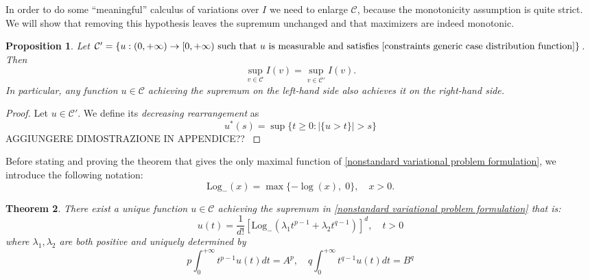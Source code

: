 \documentclass[corpo=11pt, stile=classica, tipotesi=custom,
greek, evenboxes, english]{toptesi}
\numberwithin{equation}{chapter}
\newtheorem{teo}{Theorem}[chapter] %
\newtheorem{prop}[teo]{Proposition}
\theoremstyle{remark}
\newcommand{\Log}{\ensuremath{\mathrm{Log}_-}}
\begin{document}
{\color{blue} In order to do some ``meaningful'' calculus of variations over $I$ we need to enlarge $\mathcal{C}$, because the monotonicity assumption is quite strict. We will show that removing this hypothesis leaves the supremum unchanged and that maximizers are indeed monotonic.}
\begin{prop}\label{monotonicity of maximizer}
	{\color{blue}Let $\mathcal{C}' = \{u : (0,+\infty) \rightarrow [0,+\infty) \text{ such that } u \text{ is measurable and satisfies } \eqref{constraints generic case distribution function}\}$}. Then
	\begin{equation}
		\sup_{v \in \mathcal{C}} I(v) = \sup_{v \in \mathcal{C}'} I(v).
	\end{equation}
	In particular, any function $u \in \mathcal{C}$ achieving the supremum on the left-hand side also achieves it on the right-hand side.
\end{prop}
\begin{proof}
	Let $u \in \mathcal{C}'$. We define its \emph{decreasing rearrangement} as
	\begin{equation}
		u^*(s) = \sup\{t \geq 0 : |\{u>t\}|>s\}
	\end{equation}
	{\color{blue} AGGIUNGERE DIMOSTRAZIONE IN APPENDICE?? }
\end{proof}
Before stating and proving the theorem that gives the only maximal function of \eqref{nonstandard variational problem formulation}, we introduce the following notation:
\begin{equation*}\label{Log- def}
	\Log(x) = \max\{-\log(x),\;0\}, \quad x>0.
\end{equation*}
\begin{teo}\label{nonstandard variational problem solution theorem}
	There exist a unique function $u \in \mathcal{C}$ achieving the supremum in \eqref{nonstandard variational problem formulation} that is:
	\begin{equation}\label{nonstandard variational problem solution formula}
		u(t) = \dfrac{1}{d!} \left[\Log\left(\lambda_1 t^{p-1} + \lambda_2 t^{q-1}\right)\right]^d, \quad t>0
	\end{equation}
	where $\lambda_1, \lambda_2$ are both positive and uniquely determined by
	\begin{equation*}
		p\int_0^{+\infty} t^{p-1}u(t)dt = A^p, \quad q\int_0^{+\infty} t^{q-1}u(t)dt = B^q
	\end{equation*}
\end{teo}
\end{document}
